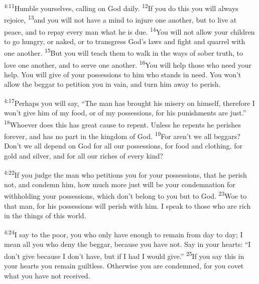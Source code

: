 \documentclass[openany,12pt,english]{book}
\newenvironment{para}{\par\pretolerance=100\tolerance=200\setlength{\emergencystretch}{0.6em}\relax}{\par}
\begin{document}
\begin{para}
    \textsuperscript{4:11}\thinspace{}Hum\-ble your\-selves, call\-ing on God dai\-ly.
    \textsuperscript{12}\thinspace{}If you do this you will al\-ways re\-joice,
    \textsuperscript{13}\thinspace{}and you will not have a mind to in\-jure one an\-oth\-er, but to live at peace, and to re\-pay eve\-ry man what he is due.
    \textsuperscript{14}\thinspace{}You will not al\-low your chil\-dren to go hun\-gry, or na\-ked, or to trans\-gress God's laws and fight and quar\-rel with one an\-oth\-er.
    \textsuperscript{15}\thinspace{}But you will teach them to walk in the ways of so\-ber truth, to love one an\-oth\-er, and to serve one an\-oth\-er.
    \textsuperscript{16}\thinspace{}You will help those who need your help. You will give of your possessions to him who stands in need. You won't al\-low the beg\-gar to pe\-ti\-tion you in vain, and turn him a\-way to per\-ish.
\end{para}

\begin{para}
    \textsuperscript{4:17}\thinspace{}Per\-haps you will say, “The man has brought his mis\-er\-y on him\-self, there\-fore I won't give him of my food, or of my possessions, for his punishments are just.”
    \textsuperscript{18}\thinspace{}Who\-ev\-er does this has great cause to re\-pent. Un\-less he repents he perishes for\-ev\-er, and has no part in the king\-dom of God.
    \textsuperscript{19}\thinspace{}For aren't we all beggars? Don't we all de\-pend on God for all our possessions, for food and cloth\-ing, for gold and sil\-ver, and for all our rich\-es of eve\-ry kind?
\end{para}

\begin{para}
    \textsuperscript{4:22}\thinspace{}If you judge the man who petitions you for your possessions, that he per\-ish not, and con\-demn him, how much more just will be your con\-dem\-na\-tion for with\-hold\-ing your possessions, which don't be\-long to you but to God.
    \textsuperscript{23}\thinspace{}Woe to that man, for his possessions will per\-ish with him. I speak to those who are rich in the things of this world.
\end{para}

\begin{para}
    \textsuperscript{4:24}\thinspace{}I say to the poor, you who on\-ly have e\-nough to re\-main from day to day; I mean all you who de\-ny the beg\-gar, be\-cause you have not. Say in your hearts: “I don't give be\-cause I don't have, but if I had I would give.”
    \textsuperscript{25}\thinspace{}If you say this in your hearts you re\-main guilt\-less. Oth\-er\-wise you are condemned, for you cov\-et what you have not re\-ceived.
\end{para}
\end{document}
